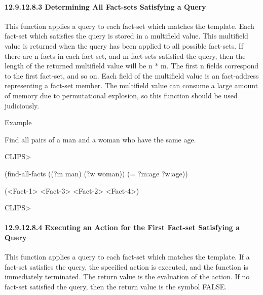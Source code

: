 \documentclass[letterpaper,10pt,english]{sphinxmanual}
\begin{document}
\paragraph{12.9.12.8.3 Determining All Fact-sets Satisfying a Query}
\label{\detokenize{actions:determining-all-fact-sets-satisfying-a-query}}
This function applies a query to each fact-set which matches the
template. Each fact-set which satisfies the query is stored in a
multifield value. This multifield value is returned when the query has
been applied to all possible fact-sets. If there are n facts in each
fact-set, and m fact-sets satisfied the query, then the length of the
returned multifield value will be n * m. The first n fields correspond
to the first fact-set, and so on. Each field of the multifield value is
an fact-address representing a fact-set member. The multifield value can
consume a large amount of memory due to permutational explosion, so this
function should be used judiciously.


\begin{sphinxVerbatim}[commandchars=\\\{\}]
  
\end{sphinxVerbatim}

Example

Find all pairs of a man and a woman who have the same age.

CLIPS\textgreater{}

(find-all-facts ((?m man) (?w woman)) (= ?m:age ?w:age))

(\textless{}Fact-1\textgreater{} \textless{}Fact-3\textgreater{} \textless{}Fact-2\textgreater{} \textless{}Fact-4\textgreater{})

CLIPS\textgreater{}


\paragraph{12.9.12.8.4 Executing an Action for the First Fact-set Satisfying a Query}
\label{\detokenize{actions:executing-an-action-for-the-first-fact-set-satisfying-a-query}}
This function applies a query to each fact-set which matches the
template. If a fact-set satisfies the query, the specified action is
executed, and the function is immediately terminated. The return value
is the evaluation of the action. If no fact-set satisfied the query,
then the return value is the symbol FALSE.
\end{document}
